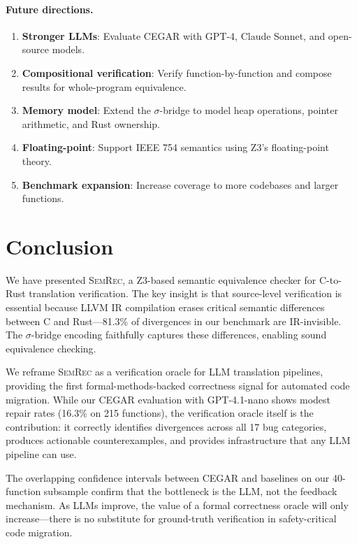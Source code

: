 \documentclass[10pt,letterpaper]{article}
\begin{document}
\paragraph{Future directions.}
\begin{enumerate}[itemsep=1pt]
\item \textbf{Stronger LLMs}: Evaluate CEGAR with GPT-4, Claude Sonnet, and
  open-source models.
\item \textbf{Compositional verification}: Verify function-by-function and
  compose results for whole-program equivalence.
\item \textbf{Memory model}: Extend the $\sigma$-bridge to model heap operations,
  pointer arithmetic, and Rust ownership.
\item \textbf{Floating-point}: Support IEEE 754 semantics using Z3's
  floating-point theory.
\item \textbf{Benchmark expansion}: Increase coverage to more codebases and
  larger functions.
\end{enumerate}

\section{Conclusion}
\label{sec:conclusion}

We have presented \textsc{SemRec}, a Z3-based semantic equivalence checker for
C-to-Rust translation verification. The key insight is that source-level
verification is essential because LLVM IR compilation erases critical semantic
differences between C and Rust---81.3\% of divergences in our benchmark are
IR-invisible. The $\sigma$-bridge encoding faithfully captures these differences,
enabling sound equivalence checking.

We reframe \textsc{SemRec} as a verification oracle for LLM translation pipelines,
providing the first formal-methods-backed correctness signal for automated code
migration. While our CEGAR evaluation with GPT-4.1-nano shows modest repair rates
(16.3\% on 215 functions), the verification oracle itself is the contribution: it
correctly identifies divergences across all 17 bug categories, produces actionable
counterexamples, and provides infrastructure that any LLM pipeline can use.

The overlapping confidence intervals between CEGAR and baselines on our 40-function
subsample confirm that the bottleneck is the LLM, not the feedback mechanism. As
LLMs improve, the value of a formal correctness oracle will only increase---there
is no substitute for ground-truth verification in safety-critical code migration.
\end{document}
